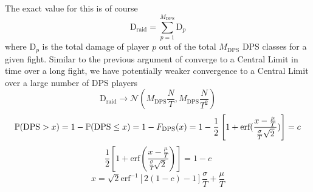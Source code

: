The exact value for this is of course
%
$$
\text{D}_\text{raid} = \sum_{p=1}^{M_\text{DPS}} \text{D}_p
$$
%
where $\text{D}_p$ is the total damage of player $p$ out of the total $M_\text{DPS}$ DPS classes for a given fight. Similar to the previous argument of converge to a Central Limit in time over a long fight, we have potentially weaker convergence to a Central Limit over a large number of DPS players
%
$$
\text{D}_\text{raid} \rightarrow \mathcal{N}(M_\text{DPS} \frac{N}{T}, M_\text{DPS} \frac{N}{T^2})
$$
$$
\P(\text{DPS} > x) = 1 - \P(\text{DPS} \leq x)
= 1 - F_\text{DPS}(x)
= 1 - \frac{1}{2} \left[ 1 + \text{erf}(\frac{ x - \frac{\mu}{T} }{ \frac{\sigma}{T} \sqrt{2} }) \right] = c
$$
%
$$
\frac{1}{2} \left[ 1 + \text{erf}(\frac{ x - \frac{\mu}{T} }{ \frac{\sigma}{T} \sqrt{2} }) \right] = 1 - c
$$
$$
x = \sqrt{2} \text{erf}^{-1} \left[ 2 (1 - c) - 1 \right] \frac{\sigma}{T} + \frac{\mu}{T}
$$
